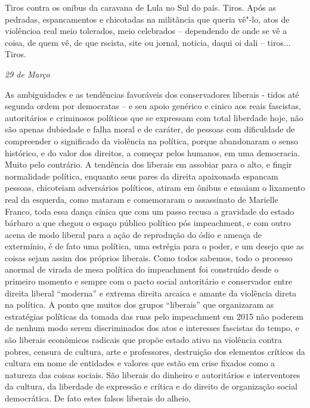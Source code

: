 Tiros contra os onibus da caravana de Lula no Sul do país. Tiros. Após
as pedradas, espancamentos e chicotadas na militância que queria vê"-lo,
atos de violêncioa real meio tolerados, meio celebrados -- dependendo de
onde se vê a coisa, de quem vê, de que rscista, site ou jornal, noticia,
daqui oi dali -- tiros... Tiros.

\begin{flushright}
\emph{29 de Março}
\end{flushright}

As ambiguidades e as tendências favoráveis dos conservadores liberais -
tidos até segunda ordem por democratas -- e seu apoio genérico e cinico
aos reais fascistas, autoritários e criminosos políticos que se
expressam com total liberdade hoje, não são apenas dubiedade e falha
moral e de caráter, de pessoas com dificuldade de compreender o
significado da violência na política, porque abandonaram o senso
histórico, e do valor dos direitos, a começar pelos humanos, em uma
democracia. Muito pelo contrário. A tendência dos liberais em assobiar
para o alto, e fingir normalidade política, enquanto seus pares da
direita apaixonada espancam pessoas, chicoteiam adversários políticos,
atiram em ônibus e ensaiam o lixamento real da esquerda, como mataram e
comemoraram o assassinato de Marielle Franco, toda essa dança cínica que
com um passo recusa a gravidade do estado bárbaro a que chegou o espaço
público político pós impeachment, e com outro acena de modo liberal para
a ação de reprodução do ódio e ameaça de extermínio, é de fato uma
política, uma estrégia para o poder, e um desejo que as coisas sejam
assim dos próprios liberais. Como todos sabemos, todo o processo anormal
de virada de mesa política do impeachment foi construído desde o
primeiro momento e sempre com o pacto social autoritário e conservador
entre direita liberal ``moderna'' e extrema direita arcaica e amante da
violência direta na política. A ponto que muitos dos grupos ``liberais''
que organizaram as estratégias políticas da tomada das ruas pelo
impeachment em 2015 não poderem de nenhum modo serem discriminados dos
atos e interesses fascistas do tempo, e são liberais econômicos radicais
que propõe estado ativo na violência contra pobres, censura de cultura,
arte e professores, destruição dos elementos críticos da cultura em nome
de entidades e valores que estão em crise fixados como a natureza das
coisas sociais. São liberais do dinheiro e autoritários e interventores
da cultura, da liberdade de expressão e crítica e do direito de
organização social democrática. De fato estes falsos liberais do alheio,
